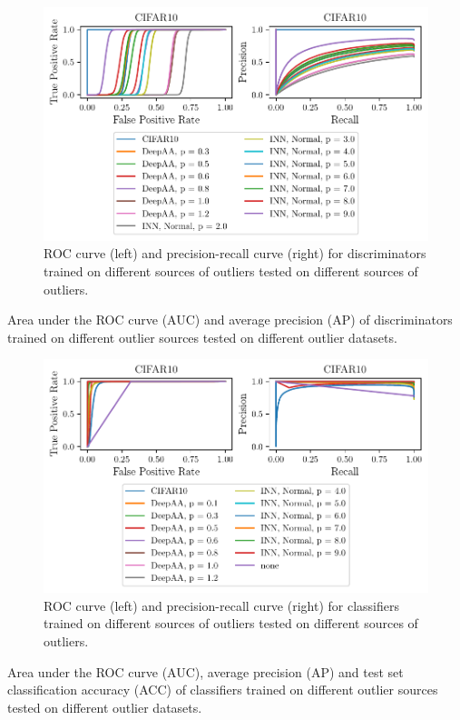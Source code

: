 \begin{figure}[htpb]
    \centering
    \includegraphics{figures/samples/ferg_CIFAR10_curve_disc.pdf}
    \caption{ROC curve (left) and precision-recall curve (right) for
        discriminators trained on different sources of outliers tested on
        different sources of outliers.}%
    \label{fig:ferg_stat_disc}
\end{figure}

\begin{table}[htpb]
	\centering
        \caption{Area under the ROC curve (AUC) and average precision (AP) of
        discriminators trained on different outlier sources tested on different
        outlier datasets.}%
	\label{tab:ferg_disc}
	
\end{table}

\begin{figure}[htpb]
    \centering
    \includegraphics{figures/samples/ferg_CIFAR10_curve_class.pdf}
    \caption{ROC curve (left) and precision-recall curve (right) for
        classifiers trained on different sources of outliers tested on
        different sources of outliers.}%
    \label{fig:ferg_stat_class}
\end{figure}

\begin{table}[htpb]
	\centering
        \caption{Area under the ROC curve (AUC), average precision (AP) and
        test set classification accuracy (ACC) of classifiers trained on
        different outlier sources tested on different outlier datasets.}%
	\label{tab:ferg_class}
	
\end{table}
